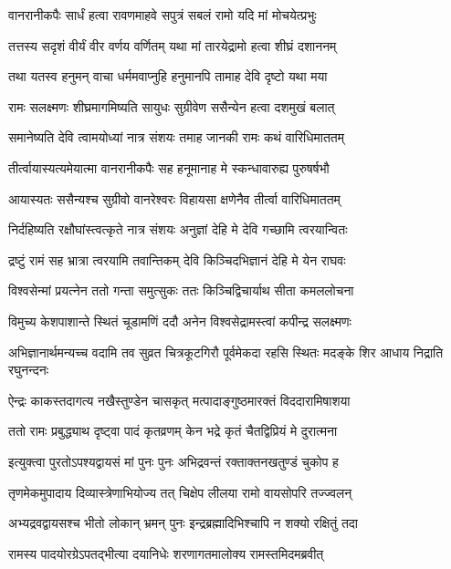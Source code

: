 \twolineshloka
{वानरानीकपैः सार्धं हत्वा रावणमाहवे}
{सपुत्रं सबलं रामो यदि मां मोचयेत्प्रभुः} %

\twolineshloka
{तत्तस्य सदृशं वीर्यं वीर वर्णय वर्णितम्}
{यथा मां तारयेद्रामो हत्वा शीघ्रं दशाननम्} %

\twolineshloka
{तथा यतस्व हनुमन् वाचा धर्ममवाप्नुहि}
{हनुमानपि तामाह देवि दृष्टो यथा मया} %

\twolineshloka
{रामः सलक्ष्मणः शीघ्रमागमिष्यति सायुधः}
{सुग्रीवेण ससैन्येन हत्वा दशमुखं बलात्} %

\twolineshloka
{समानेष्यति देवि त्वामयोध्यां नात्र संशयः}
{तमाह जानकी रामः कथं वारिधिमाततम्} %

\twolineshloka
{तीर्त्वायास्यत्यमेयात्मा वानरानीकपैः सह}
{हनूमानाह मे स्कन्धावारुह्य पुरुषर्षभौ} %

\twolineshloka
{आयास्यतः ससैन्यश्च सुग्रीवो वानरेश्वरः}
{विहायसा क्षणेनैव तीर्त्वा वारिधिमाततम्} %

\twolineshloka
{निर्दहिष्यति रक्षौघांस्त्वत्कृते नात्र संशयः}
{अनुज्ञां देहि मे देवि गच्छामि त्वरयान्वितः} %

\twolineshloka
{द्रष्टुं रामं सह भ्रात्रा त्वरयामि तवान्तिकम्}
{देवि किञ्चिदभिज्ञानं देहि मे येन राघवः} %

\twolineshloka
{विश्वसेन्मां प्रयत्नेन ततो गन्ता समुत्सुकः}
{ततः किञ्चिद्विचार्याथ सीता कमललोचना} %

\twolineshloka
{विमुच्य केशपाशान्ते स्थितं चूडामणिं ददौ}
{अनेन विश्वसेद्रामस्त्वां कपीन्द्र सलक्ष्मणः} %

\threelineshloka
{अभिज्ञानार्थमन्यच्च वदामि तव सुव्रत}
{चित्रकूटगिरौ पूर्वमेकदा रहसि स्थितः}
{मदङ्के शिर आधाय निद्राति रघुनन्दनः} %

\twolineshloka
{ऐन्द्रः काकस्तदागत्य नखैस्तुण्डेन चासकृत्}
{मत्पादाङ्गुष्ठमारक्तं विददारामिषाशया} %

\twolineshloka
{ततो रामः प्रबुद्ध्याथ दृष्ट्वा पादं कृतव्रणम्}
{केन भद्रे कृतं चैतद्विप्रियं मे दुरात्मना} %

\twolineshloka
{इत्युक्त्वा पुरतोऽपश्यद्वायसं मां पुनः पुनः}
{अभिद्रवन्तं रक्ताक्तनखतुण्डं चुकोप ह} %

\twolineshloka
{तृणमेकमुपादाय दिव्यास्त्रेणाभियोज्य तत्}
{चिक्षेप लीलया रामो वायसोपरि तज्ज्वलन्} %

\twolineshloka
{अभ्यद्रवद्वायसश्च भीतो लोकान् भ्रमन् पुनः}
{इन्द्रब्रह्मादिभिश्चापि न शक्यो रक्षितुं तदा} %

\twolineshloka
{रामस्य पादयोरग्रेऽपतद्भीत्या दयानिधेः}
{शरणागतमालोक्य रामस्तमिदमब्रवीत्} %

